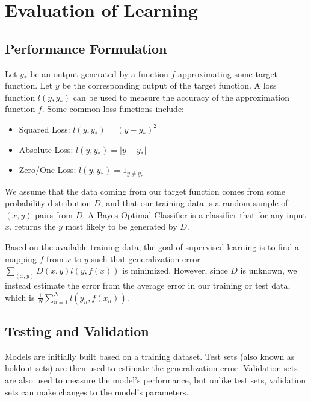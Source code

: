 \documentclass[12pt]{article}
\begin{document}
\section{Evaluation of Learning}
    \subsection{Performance Formulation}
        Let $y_*$ be an output generated by a function $f$ approximating some target function. Let $y$ be the
        corresponding output of the target function. A loss function \label{fact:LossFunction} $l(y, y_*)$ can be used
        to measure the accuracy of the approximation function $f$. Some common loss functions include:
        \begin{itemize}
            \item Squared Loss: $l(y, y_*) = (y - y_*)^2$
            \item Absolute Loss: $l(y, y_*) = |y - y_*|$
            \item Zero/One Loss: $l(y, y_*) = 1_{y \neq y_*}$
        \end{itemize}

        We assume that the data coming from our target function comes from some probability distribution $D$, and that
        our training data is a random sample of $(x, y)$ pairs from $D$. A Bayes Optimal Classifier is a classifier that
        for any input $x$, returns the $y$ most likely to be generated by $D$.

        Based on the available training data, the goal of supervised learning is to find a mapping $f$ from $x$ to $y$
        such that generalization error $\sum_{(x,y)} D(x,y)l(y,f(x))$ is minimized. However, since $D$ is unknown, we
        instead estimate the error from the average error in our training or test data, which is
        $\frac{1}{N}\sum_{n=1}^N l(y_n, f(x_n))$.

    \subsection{Testing and Validation}
        Models are initially built based on a training dataset. Test sets (also known as holdout sets) are then used to
        estimate the generalization error. Validation sets are also used to measure the model's performance, but unlike
        test sets, validation sets can make changes to the model's parameters.
\end{document}
